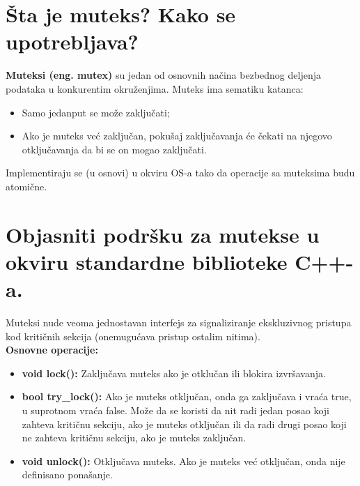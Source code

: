 \documentclass[a4paper]{article}
\begin{document}
\section{Šta je muteks? Kako se upotrebljava?}
  \textbf{Muteksi (eng. mutex)} su jedan od osnovnih načina bezbednog deljenja podataka u 
  konkurentim okruženjima. Muteks ima sematiku katanca:
    \begin{itemize}
      \item Samo jedanput se može zaključati;
      \item Ako je muteks već zaključan, pokušaj zaključavanja će čekati na njegovo 
            otključavanja da bi se on mogao zaključati.
    \end{itemize}
  Implementiraju se (u osnovi) u okviru OS-a tako da operacije sa muteksima budu atomične.

\section{Objasniti podršku za mutekse u okviru standardne biblioteke C++-a.}
  Muteksi nude veoma jednostavan interfejs za signaliziranje 
  ekskluzivnog pristupa kod kritičnih sekcija (onemugućava pristup ostalim nitima).\\
  \textbf{Osnovne operacije:}
  \begin{itemize}
    \item \textbf{void lock():} Zaključava muteks ako je otklučan ili blokira izvršavanja.
    \item \textbf{bool try\_lock():} Ako je muteks otključan, onda ga zaključava i vraća
          true, u suprotnom vraća false. Može da se koristi da nit radi jedan posao
          koji zahteva kritičnu sekciju, ako je muteks otključan ili da radi drugi posao
          koji ne zahteva kritičnu sekciju, ako je muteks zaključan.
    \item \textbf{void unlock():} Otključava muteks. Ako je muteks već otključan, onda nije
          definisano ponašanje.
  \end{itemize}\cite{cppref_mutex}
\end{document}
